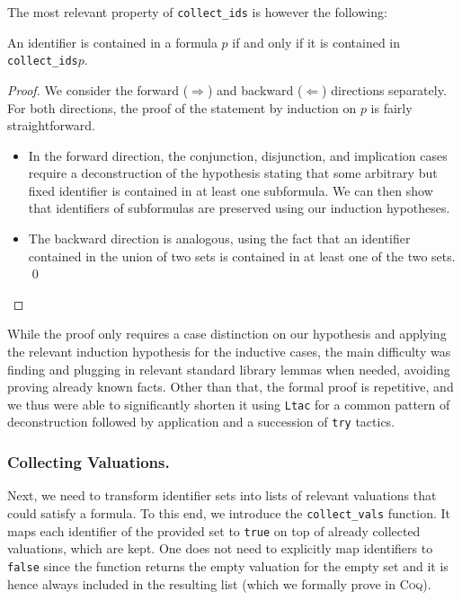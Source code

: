 The most relevant property of \texttt{collect\_ids} is however the following:
\begin{lemma}
    An identifier is contained in a formula $p$ if and only if it is contained in \texttt{collect\_ids\;$p$}.
\end{lemma}
\begin{proof}
    We consider the forward ($\Longrightarrow$) and backward ($\Longleftarrow$) directions separately.
    For both directions, the proof of the statement by induction on $p$ is fairly straightforward.
    \begin{itemize}
        \item In the forward direction, the conjunction, disjunction, and implication cases require a deconstruction of the hypothesis stating that some arbitrary but fixed identifier is contained in at least one subformula.
        We can then show that identifiers of subformulas are preserved using our induction hypotheses.
        \item The backward direction is analogous, using the fact that an identifier contained in the union of two sets is contained in at least one of the two sets. \qed
    \end{itemize}
\end{proof}
While the proof only requires a case distinction on our hypothesis and applying the relevant induction hypothesis for the inductive cases, the main difficulty was finding and plugging in relevant standard library lemmas when needed, avoiding proving already known facts.
Other than that, the formal proof is repetitive, and we thus were able to significantly shorten it using \texttt{Ltac} for a common pattern of deconstruction followed by application and a succession of \texttt{try} tactics.

\subsubsection{Collecting Valuations.}

Next, we need to transform identifier sets into lists of relevant valuations that could satisfy a formula.
To this end, we introduce the \texttt{collect\_vals} function.
It maps each identifier of the provided set to \texttt{true} on top of already collected valuations, which are kept.
One does not need to explicitly map identifiers to \texttt{false} since the function returns the empty valuation for the empty set and it is hence always included in the resulting list (which we formally prove in \textsc{Coq}).

